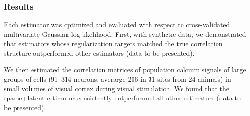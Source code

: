\documentclass[12pt]{amsart}
\begin{document}
\subsubsection*{Results}
Each estimator was optimized and evaluated with respect to cross-validated multivariate Gaussian log-likelihood.  First, with synthetic data, we demonstrated that estimators whose regularization targets matched the true correlation structure outperformed other estimators (data to be presented).  

We then estimated the correlation matrices of population calcium signals of large groups of cells (91--314 neurons, averarge 206 in 31 sites from 24 animals) in small volumes of visual cortex during visual stimulation. We found that the sparse+latent estimator consistently outperformed all other estimators (data to be presented).
\end{document}
